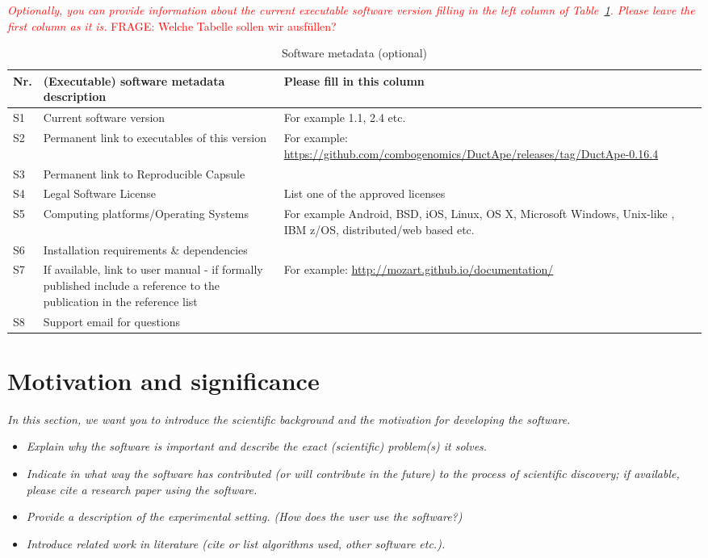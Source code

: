 \documentclass[preprint,12pt, a4paper]{elsarticle}
\begin{document}
\textcolor{red}{\textit{Optionally, you can provide information about the current executable
software version filling in the left column of
Table~\ref{executabelMetadata}. Please leave the first column as it is.} FRAGE: Welche Tabelle sollen wir ausfüllen?}

\begin{table}[!h]
\begin{tabular}{|l|p{6.5cm}|p{6.5cm}|}
\hline
\textbf{Nr.} & \textbf{(Executable) software metadata description} & \textbf{Please fill in this column} \\
\hline
S1 & Current software version & For example 1.1, 2.4 etc. \\
\hline
S2 & Permanent link to executables of this version  & For example: \url{https://github.com/combogenomics/DuctApe/releases/tag/DuctApe-0.16.4} \\
\hline
S3  & Permanent link to Reproducible Capsule & \\
\hline
S4 & Legal Software License & List one of the approved licenses \\
\hline
S5 & Computing platforms/Operating Systems & For example Android, BSD, iOS, Linux, OS X, Microsoft Windows, Unix-like , IBM z/OS, distributed/web based etc. \\
\hline
S6 & Installation requirements \& dependencies & \\
\hline
S7 & If available, link to user manual - if formally published include a reference to the publication in the reference list & For example: \url{http://mozart.github.io/documentation/} \\
\hline
S8 & Support email for questions & \\
\hline
\end{tabular}
\caption{Software metadata (optional)}
\label{executabelMetadata} 
\end{table}


\section{Motivation and significance}
\textit{In this section, we want you to introduce the scientific background and the motivation for developing the software.}

\begin{itemize}
    \item \textit{Explain why the software is important and describe the exact (scientific) problem(s) it solves.}
    \item \textit{Indicate in what way the software has contributed (or will contribute in the future) to the process of scientific discovery; if available, please cite a research paper using the software.}
    \item \textit{Provide a description of the experimental setting. (How does the user use the software?)}
    \item \textit{Introduce related work in literature (cite or list algorithms used, other software etc.).}
\end{itemize}
\end{document}
